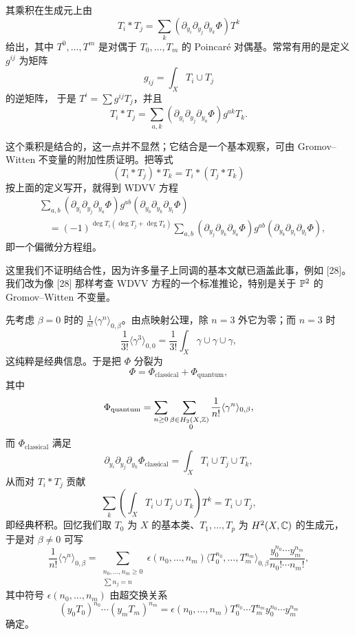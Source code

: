 其乘积在生成元上由
\[
T_i*T_j=\sum_{k}(\partial_{y_i}\partial_{y_j}\partial_{y_k}\Phi)T^{k}
\]
给出，其中 $T^{0},\dots,T^{m}$ 是对偶于 $T_0,\dots,T_m$ 的 Poincaré 对偶基。常常有用的是定义 $g^{ij}$ 为矩阵
\[
g_{ij}=\int_X T_i\cup T_j
\]
的逆矩阵，
于是 $T^{i}=\sum g^{ij}T_j$，并且
\[
T_i*T_j=\sum_{a,k}(\partial_{y_i}\partial_{y_j}\partial_{y_a}\Phi)g^{ak}T_k.
\]

这个乘积是结合的，这一点并不显然；它结合是一个基本观察，可由 Gromov–Witten 不变量的附加性质证明。把等式
\[
(T_i*T_j)*T_k=T_i*(T_j*T_k)
\]
按上面的定义写开，就得到 WDVV 方程
\begin{align*}
&\sum_{a,b}(\partial_{y_i}\partial_{y_j}\partial_{y_a}\Phi)g^{ab}(\partial_{y_b}\partial_{y_k}\partial_{y_l}\Phi)\\
&\quad=(-1)^{\deg T_i(\deg T_j+\deg T_k)}\sum_{a,b}(\partial_{y_j}\partial_{y_k}\partial_{y_a}\Phi)g^{ab}(\partial_{y_b}\partial_{y_i}\partial_{y_l}\Phi),
\end{align*}
即一个偏微分方程组。

这里我们不证明结合性，因为许多量子上同调的基本文献已涵盖此事，例如 [28]。我们改为像 [28] 那样考查 WDVV 方程的一个标准推论，特别是关于 $\mathbb{P}^2$ 的 Gromov–Witten 不变量。

先考虑 $\beta=0$ 时的 $\frac{1}{n!}\langle\gamma^n\rangle_{0,\beta}$。由点映射公理，除 $n=3$ 外它为零；而 $n=3$ 时
\[
\frac{1}{3!}\langle\gamma^3\rangle_{0,0}=\frac{1}{3!}\int_X\gamma\cup\gamma\cup\gamma,
\]
这纯粹是经典信息。于是把 $\Phi$ 分裂为
\[
\Phi=\Phi_{\text{classical}}+\Phi_{\text{quantum}},
\]
其中
\[
\Phi_{\text{quantum}}=\sum_{n\ge 0}\sum_{\substack{\beta\in H_2(X,\Z)\\\ 0}}\frac{1}{n!}\langle\gamma^n\rangle_{0,\beta},
\]
而 $\Phi_{\text{classical}}$ 满足
\[
\partial_{y_i}\partial_{y_j}\partial_{y_k}\Phi_{\text{classical}}=\int_X T_i\cup T_j\cup T_k,
\]
从而对 $T_i*T_j$ 贡献
\[
\sum_{k}\left(\int_X T_i\cup T_j\cup T_k\right)T^{k}=T_i\cup T_j,
\]
即经典杯积。回忆我们取 $T_0$ 为 $X$ 的基本类、$T_1,\dots,T_p$ 为 $H^2(X,\mathbb{C})$ 的生成元，于是对 $\beta\neq 0$ 可写
\[
\frac{1}{n!}\langle\gamma^n\rangle_{0,\beta}=\sum_{\substack{n_0,\dots,n_m\ge 0\\\sum n_j=n}}\epsilon(n_0,\dots,n_m)\langle T_0^{n_0},\dots,T_m^{n_m}\rangle_{0,\beta}\frac{y_0^{n_0}\cdots y_m^{n_m}}{n_0!\cdots n_m!},
\]
其中符号 $\epsilon(n_0,\dots,n_m)$ 由超交换关系
\[
(y_0T_0)^{n_0}\cdots(y_mT_m)^{n_m}=\epsilon(n_0,\dots,n_m)T_0^{n_0}\cdots T_m^{n_m}y_0^{n_0}\cdots y_m^{n_m}
\]
确定。

